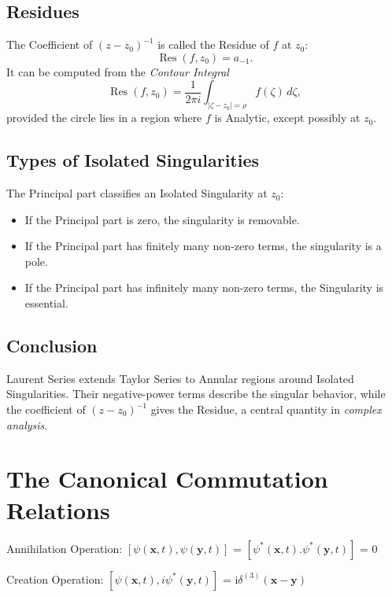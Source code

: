 \documentclass[a4paper, 10pt, onepage]{elegantbook}
\begin{document}
{\subsection{Residues}

The Coefficient of \((z-z_0)^{-1}\) is called the Residue of \(f\)
at \(z_0\):
\[
\operatorname{Res}(f,z_0)=a_{-1}.
\]
It can be computed from the \emph{Contour Integral}
\[
\operatorname{Res}(f,z_0)
=
\frac{1}{2\pi i}
\int_{|\zeta-z_0|=\rho}f(\zeta)\,d\zeta,
\]
provided the circle lies in a region where \(f\) is Analytic, except possibly at \(z_0\).

\subsection{Types of Isolated Singularities}

The Principal part classifies an Isolated Singularity at \(z_0\):
\begin{itemize}
  \item If the Principal part is zero, the singularity is removable.
  \item If the Principal part has finitely many non-zero terms, the
        singularity is a pole.
  \item If the Principal part has infinitely many non-zero terms, the
        Singularity is essential.
\end{itemize}

\subsection{Conclusion}

Laurent Series extends Taylor Series to Annular regions around Isolated Singularities. Their negative-power terms 
describe the singular behavior, while the coefficient of \((z-z_0)^{-1}\) gives the Residue, a central quantity in 
\emph{complex analysis}.


\newpage

\section{The Canonical Commutation Relations}

Annihilation Operation: $[\psi (\mathbf{x}, t), \psi (\mathbf{y}, t)]$ = $[\psi^{*} (\mathbf{x}, t). \psi^{*} 
(\mathbf{y}, t)]$ = $0$  

Creation Operation: $[\psi (\mathbf{x}, t), i \psi^{*} (\mathbf{y}, t)]$  = i$\delta^{(3)} (\mathbf{x} - \mathbf{y})$   


}
\end{document}
